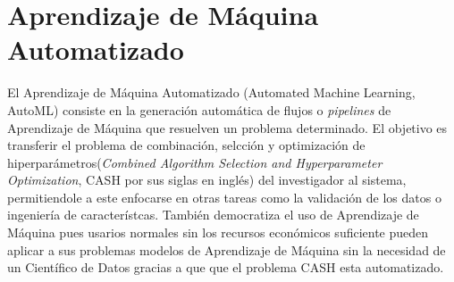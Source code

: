 \section{Aprendizaje de M\'aquina Automatizado}
El Aprendizaje de M\'aquina Automatizado (Automated Machine Learning, AutoML) consiste en la generaci\'on autom\'atica de flujos o \textit{pipelines} de Aprendizaje de M\'aquina que resuelven un problema determinado. El objetivo es transferir el problema de combinaci\'on, selcci\'on y optimizaci\'on de hiperpar\'ametros(\textit{Combined Algorithm Selection and Hyperparameter Optimization}, CASH por sus siglas en ingl\'es) del investigador al sistema, permitiendole a este enfocarse en otras tareas como la validaci\'on de los datos o ingenier\'ia de caracter\'istcas. Tambi\'en democratiza el uso de Aprendizaje de M\'aquina pues usarios normales sin los recursos econ\'omicos suficiente pueden aplicar a sus problemas modelos de Aprendizaje de M\'aquina sin la necesidad de un Cient\'ifico de Datos gracias a que que el problema CASH esta automatizado.



